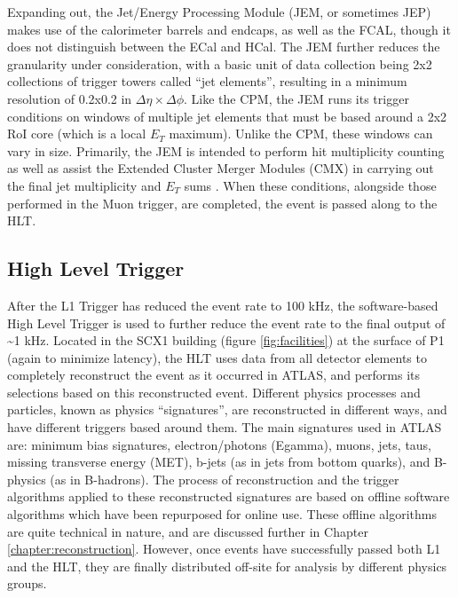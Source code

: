         Expanding out, the Jet/Energy Processing Module (JEM, or sometimes JEP) makes use of the calorimeter barrels and endcaps, as well as the FCAL, though it does not distinguish between the ECal and HCal.
        The JEM further reduces the granularity under consideration, with a basic unit of data collection being 2x2 collections of trigger towers called ``jet elements'', resulting in a minimum resolution of 0.2x0.2 in $\Delta \eta \times \Delta \phi$.
        Like the CPM, the JEM runs its trigger conditions on windows of multiple jet elements that must be based around a 2x2 RoI core (which is a local $E_T$ maximum).
        Unlike the CPM, these windows can vary in size.
        Primarily, the JEM is intended to perform hit multiplicity counting as well as assist the Extended Cluster Merger Modules (CMX) in carrying out the final jet multiplicity and $E_T$ sums \cite{L1_calo_run1}\cite{trigger_run2}.
        When these conditions, alongside those performed in the Muon trigger, are completed, the event is passed along to the HLT.


\FloatBarrier
    \subsection{High Level Trigger}

        After the L1 Trigger has reduced the event rate to 100 kHz, the software-based High Level Trigger is used to further reduce the event rate to the final output of \textasciitilde 1 kHz.
        Located in the SCX1 building (figure \ref{fig:facilities}) at the surface of P1 (again to minimize latency), the HLT uses data from all detector elements to completely reconstruct the event as it occurred in ATLAS, and performs its selections based on this reconstructed event.
        Different physics processes and particles, known as physics ``signatures'', are reconstructed in different ways, and have different triggers based around them. 
        The main signatures used in ATLAS are: minimum bias signatures, electron/photons (Egamma), muons, jets, taus, missing transverse energy (MET), b-jets (as in jets from bottom quarks), and B-physics (as in B-hadrons).
        The process of reconstruction and the trigger algorithms applied to these reconstructed signatures are based on offline software algorithms which have been repurposed for online use.
        These offline algorithms are quite technical in nature, and are discussed further in Chapter \ref{chapter:reconstruction}.
        However, once events have successfully passed both L1 and the HLT, they are finally distributed off-site for analysis by different physics groups.

